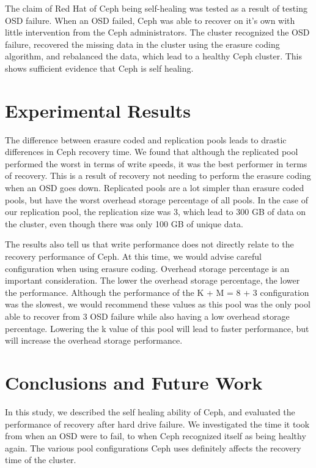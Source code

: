\documentclass[conference,compsoc]{IEEEtran}
\begin{document}
The claim of Red Hat of Ceph being self-healing was tested as a result of testing OSD failure. When an OSD failed, Ceph was able to recover on it's own with little intervention from the Ceph administrators. The cluster recognized the OSD failure, recovered the missing data in the cluster using the erasure coding algorithm, and rebalanced the data, which lead to a healthy Ceph cluster. This shows sufficient evidence that Ceph is self healing. 

\section{Experimental Results}

The difference between erasure coded and replication pools leads to drastic differences in Ceph recovery time. We found that although the replicated pool performed the worst in terms of write speeds, it was the best performer in terms of recovery. This is a result of recovery not needing to perform the erasure coding when an OSD goes down. Replicated pools are a lot simpler than erasure coded pools, but have the worst overhead storage percentage of all pools. In the case of our replication pool, the replication size was 3, which lead to 300 GB of data on the cluster, even though there was only 100 GB of unique data.

The results also tell us that write performance does not directly relate to the recovery performance of Ceph. At this time, we would advise careful configuration when using erasure coding. Overhead storage percentage is an important consideration. The lower the overhead storage percentage, the lower the performance. Although the performance of the K + M = 8 + 3 configuration was the slowest, we would recommend these values as this pool was the only pool able to recover from 3 OSD failure while also having a low overhead storage percentage. Lowering the k value of this pool will lead to faster performance, but will increase the overhead storage performance. 

\section{Conclusions and Future Work}

In this study, we described the self healing ability of Ceph, and evaluated the performance of recovery after hard drive failure. We investigated the time it took from when an OSD were to fail, to when Ceph recognized itself as being healthy again. The various pool configurations Ceph uses definitely affects the recovery time of the cluster.
\end{document}
